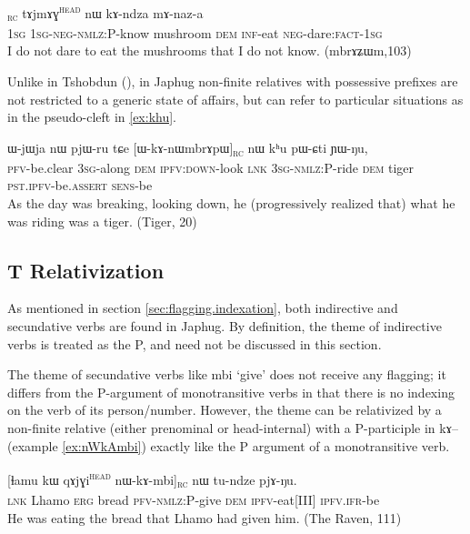 \documentclass[oldfontcommands,oneside,a4paper,11pt]{article}
\newcommand{\ipa}[1]{{\phon #1}} %
\newcommand{\topic}{\textsc{dem}}
\newcommand{\tete}{\textsuperscript{\textsc{head}}}
\newcommand{\rc}{\textsubscript{\textsc{rc}}}
\begin{document}
        \begin{exe}
   \ex \label{ex:tajmag}
   \gll
[\ipa{aʑo}  	\ipa{a-mɤ-kɤ-sɯz}]\rc{}  	\ipa{tɤjmɤɣ}\tete{}  	\ipa{nɯ}  	\ipa{kɤ-ndza}  	\ipa{mɤ-naz-a}  \\
\textsc{1sg} \textsc{1sg-neg-nmlz:P}-know mushroom \textsc{dem} \textsc{inf}-eat \textsc{neg}-dare:\textsc{fact}-\textsc{1sg} \\
\glt I do not dare to eat the mushrooms that I do not know. (\ipa{mbrɤʑɯm},103)
\end{exe}
 

Unlike in Tshobdun (\citealt[10]{jacksonlin07}), in Japhug non-finite relatives with possessive prefixes are not restricted to a generic state of affairs, but can refer to particular situations as in the pseudo-cleft in \ref{ex:khu}.

     \begin{exe}
   \ex \label{ex:khu}
   \gll  \ipa{lɤ-fsoʁ}  	\ipa{ɯ-jɯja}  	\ipa{nɯ}  	\ipa{pjɯ-ru}  	\ipa{tɕe}  	[\ipa{ɯ-kɤ-nɯmbrɤpɯ}]\rc{}  	\ipa{nɯ}  	\ipa{kʰu}  	\ipa{pɯ-ɕti}  	\ipa{ɲɯ-ŋu,}  \\
\textsc{pfv}-be.clear    \textsc{3sg}-along  \textsc{dem} \textsc{ipfv:down}-look \textsc{lnk} \textsc{3sg-nmlz:P}-ride \topic{} tiger \textsc{pst.ipfv}-be.\textsc{assert}  \textsc{sens}-be \\
\glt As the day was breaking, looking down, he (progressively realized that) what he was riding was a tiger. (Tiger, 20)
\end{exe}


\subsection{T Relativization}
As mentioned in section \ref{sec:flagging.indexation}, both indirective and secundative verbs are found in Japhug. By definition, the theme of indirective verbs is treated as the P, and need not be discussed in this section.

The theme of secundative verbs like \ipa{mbi} `give' does not receive any flagging; it differs from the P-argument of monotransitive verbs in that there is no indexing on the verb of its person/number. However, the theme can be relativized by a non-finite relative (either prenominal or head-internal) with a P-participle in \ipa{kɤ}--  (example \ref{ex:nWkAmbi}) exactly like the P argument of a monotransitive verb. 

\begin{exe}
\ex \label{ex:nWkAmbi}
\gll      \ipa{tɕe} 	[\ipa{ɬamu} 	\ipa{kɯ} 	\ipa{qɤjɣi}\tete{} 	\ipa{nɯ-kɤ-mbi}]\rc{} 	\ipa{nɯ} 	\ipa{tu-ndze} 	\ipa{pjɤ-ŋu.}   \\
\textsc{lnk} Lhamo \textsc{erg} bread \textsc{pfv-nmlz}:P-give \topic{} \textsc{ipfv}-eat[III] \textsc{ipfv.ifr}-be  \\
 \glt    He was eating the bread that Lhamo had given him. (The Raven, 111)
\end{exe} 
\end{document}

